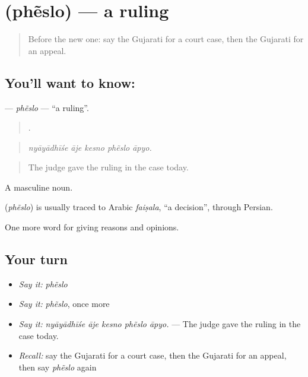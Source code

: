 \section[\texorpdfstring{\gu{ફેંસલો} (phẽslo)}{ફેંસલો (phẽslo)}]{ (phẽslo) — a ruling}

\label{lesson:GU-C348-pheslo}



\begin{quote}
Before the new one: say the Gujarati for a court case, then the Gujarati for an appeal.
\end{quote}

\subsection*{You'll want to know: }
\textbf{} — \emph{phẽslo} — \textquotedblleft{}a ruling\textquotedblright{}.

\begin{quote}
    .
\end{quote}

\begin{quote}
\emph{nyāyādhīśe āje kesno phẽslo āpyo.}
\end{quote}

\begin{quote}
The judge gave the ruling in the case today.
\end{quote}

A masculine noun.

\begin{cousinweb}
\textbf{} (\emph{phẽslo}) is usually traced to Arabic \emph{faiṣala}, \textquotedblleft{}a decision\textquotedblright{}, through Persian.
\end{cousinweb}

\begin{grammarlens}[title={What you've built}]
One more word for giving reasons and opinions.
\end{grammarlens}

\subsection*{Your turn}
\begin{itemize}
\raggedright
  \item \emph{Say it:} \emph{phẽslo}
  \item \emph{Say it:} \emph{phẽslo}, once more
  \item \emph{Say it:} \emph{nyāyādhīśe āje kesno phẽslo āpyo.} — The judge gave the ruling in the case today.
  \item \emph{Recall:} say the Gujarati for a court case, then the Gujarati for an appeal, then say \emph{phẽslo} again
\end{itemize}

